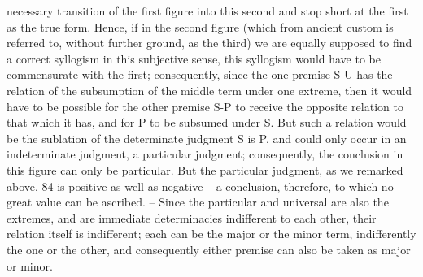 necessary transition of the first figure into this second and stop short at the
first as the true form. Hence, if in the second figure (which from ancient
custom is referred to, without further ground, as the third) we are equally
supposed to find a correct syllogism in this subjective sense, this syllogism
would have to be commensurate with the first; consequently, since the one
premise S-U has the relation of the subsumption of the middle term under
one extreme, then it would have to be possible for the other premise S-P to
receive the opposite relation to that which it has, and for P to be subsumed
under S. But such a relation would be the sublation of the determinate
judgment S is P, and could only occur in an indeterminate judgment, a
particular judgment; consequently, the conclusion in this figure can only
be particular. But the particular judgment, as we remarked above, 84 is
positive as well as negative – a conclusion, therefore, to which no great
value can be ascribed. – Since the particular and universal are also the
extremes, and are immediate determinacies indifferent to each other, their
relation itself is indifferent; each can be the major or the minor term,
indifferently the one or the other, and consequently either premise can also
be taken as major or minor.

